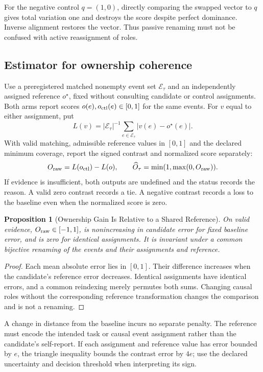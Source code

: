 \documentclass[11pt,a4paper]{article}
\newtheorem{proposition}[theorem]{Proposition}
\theoremstyle{definition}
\newcommand{\OwnField}{O}
\begin{document}
For the negative control $q=(1,0)$, directly comparing the swapped vector to $q$ gives total variation one and destroys the score despite perfect dominance. Inverse alignment restores the vector. Thus passive renaming must not be confused with active reassignment of roles.

\subsection{Estimator for ownership coherence}
Use a preregistered matched nonempty event set $\mathcal E_\tau$ and an independently assigned reference $o^\star$, fixed without consulting candidate or control assignments. Both arms report scores $o(e),o_{\rm ctl}(e)\in[0,1]$ for the same events. For $v$ equal to either assignment, put
\[
 L(v)=|\mathcal E_\tau|^{-1}\sum_{e\in\mathcal E_\tau}|v(e)-o^\star(e)|.
\]
With valid matching, admissible reference values in $[0,1]$ and the declared minimum coverage, report the signed contrast and normalized score separately:
\[
 O_{\rm raw}=L(o_{\rm ctl})-L(o),\qquad
 \widehat{\OwnField}_\tau=\min(1,\max(0,O_{\rm raw})).
\]
If evidence is insufficient, both outputs are undefined and the status records the reason. A valid zero contrast records a tie. A negative contrast records a loss to the baseline even when the normalized score is zero.

\begin{proposition}[Ownership Gain Is Relative to a Shared Reference]\label{prop:ownership-reference-gain}
On valid evidence, $O_{\rm raw}\in[-1,1]$, is nonincreasing in candidate error for fixed baseline error, and is zero for identical assignments. It is invariant under a common bijective renaming of the events and their assignments and reference.
\end{proposition}
\begin{proof}
Each mean absolute error lies in $[0,1]$. Their difference increases when the candidate's reference error decreases. Identical assignments have identical errors, and a common reindexing merely permutes both sums. Changing causal roles without the corresponding reference transformation changes the comparison and is not a renaming.
\end{proof}

A change in distance from the baseline incurs no separate penalty. The reference must encode the intended task or causal event assignment rather than the candidate's self-report. If each assignment and reference value has error bounded by $e$, the triangle inequality bounds the contrast error by $4e$; use the declared uncertainty and decision threshold when interpreting its sign.
\end{document}
